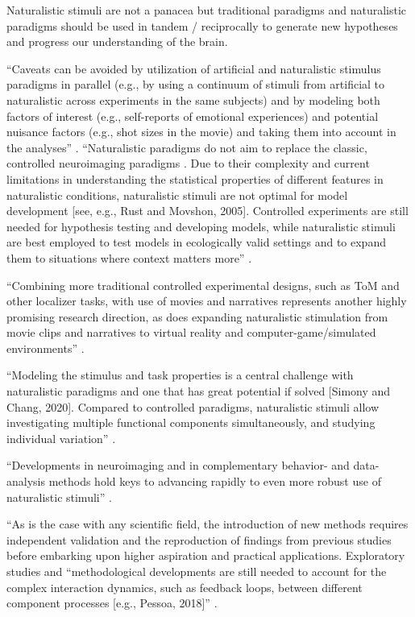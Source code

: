 %
Naturalistic stimuli are not a panacea but traditional paradigms and
naturalistic paradigms should be used in tandem / reciprocally to generate new
hypotheses and progress our understanding of the brain.

%
``Caveats can be avoided by utilization of artificial and naturalistic stimulus
paradigms in parallel (e.g., by using a continuum of stimuli from artificial to
naturalistic across experiments in the same subjects) and by modeling both
factors of interest (e.g., self-reports of emotional experiences) and potential
nuisance factors (e.g., shot sizes in the movie) and taking them into account in
the analyses'' \citep{jaaskelainen2021movies}.
%
``Naturalistic paradigms do not aim to replace the classic, controlled
neuroimaging paradigms \citep{sonkusare2019naturalistic}.
%
Due to their complexity and current limitations in understanding the statistical
properties of different features in naturalistic conditions, naturalistic
stimuli are not optimal for model development [see, e.g., Rust and Movshon,
2005].
%
Controlled experiments are still needed for hypothesis testing and developing
models, while naturalistic stimuli are best employed to test models in
ecologically valid settings and to expand them to situations where context
matters more'' \citep[][p. 19]{saarimaki2021naturalistic}.

%
``Combining more traditional controlled experimental designs, such as ToM and
other localizer tasks, with use of movies and narratives represents another
highly promising research direction, as does expanding naturalistic stimulation
from movie clips and narratives to virtual reality and computer-game/simulated
environments'' \citep{jaaskelainen2021movies}.


%
``Modeling the stimulus and task properties is a central challenge with
naturalistic paradigms and one that has great potential if solved [Simony and
Chang, 2020].
%
Compared to controlled paradigms, naturalistic stimuli allow investigating
multiple functional components simultaneously, and studying individual
variation'' \citep{saarimaki2021naturalistic}.

%
``Developments in neuroimaging and in complementary behavior- and data-analysis
methods hold keys to advancing rapidly to even more robust use of naturalistic
stimuli'' \citep{jaaskelainen2021movies}.


%
``As is the case with any scientific field, the introduction of new
methods requires independent validation and the reproduction of findings from
previous studies before embarking upon higher aspiration and practical
applications.
%
Exploratory studies and ``methodological developments are still needed to
account for the complex interaction dynamics, such as feedback loops, between
different component processes [e.g., Pessoa, 2018]''
\citep{saarimaki2021naturalistic}.


